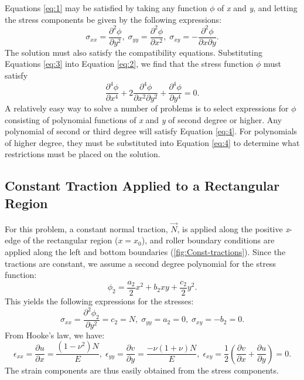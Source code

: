 Equations \ref{eq:1} may be satisfied by taking any function $\phi$
of \textit{x} and \textit{y}, and letting the stress components be
given by the following expressions:
\begin{equation}
\sigma_{xx}=\frac{\partial^{2}\phi}{\partial y^{2}},\;\sigma_{yy}=\frac{\partial^{2}\phi}{\partial x^{2}},\;\sigma_{xy}=-\frac{\partial^{2}\phi}{\partial x\partial y}.\label{eq:3}
\end{equation}
The solution must also satisfy the compatibility equations. Substituting
Equations \ref{eq:3} into Equation \ref{eq:2}, we find that the
stress function $\phi$ must satisfy
\begin{equation}
\frac{\partial^{4}\phi}{\partial x^{4}}+2\frac{\partial^{4}\phi}{\partial x^{2}\partial y^{2}}+\frac{\partial^{4}\phi}{\partial y^{4}}=0.\label{eq:4}
\end{equation}
A relatively easy way to solve a number of problems is to select expressions
for $\phi$ consisting of polynomial functions of \textit{x} and \textit{y}
of second degree or higher. Any polynomial of second or third degree
will satisfy Equation \ref{eq:4}. For polynomials of higher degree,
they must be substituted into Equation \ref{eq:4} to determine what
restrictions must be placed on the solution.


\subsection{\label{sub:Analytical-Constant-Traction}Constant Traction Applied
to a Rectangular Region}

For this problem, a constant normal traction, $\overrightarrow{N}$,
is applied along the positive \textit{x}-edge of the rectangular region
($x=x_{0}$), and roller boundary conditions are applied along the
left and bottom boundaries (\ref{fig:Const-tractions}). Since the
tractions are constant, we assume a second degree polynomial for the
stress function:
\begin{equation}
\phi_{2}=\frac{a_{2}}{2}x^{2}+b_{2}xy+\frac{c_{2}}{2}y^{2}.\label{eq:5}
\end{equation}
This yields the following expressions for the stresses:
\begin{equation}
\sigma_{xx}=\frac{\partial^{2}\phi_{2}}{\partial y^{2}}=c_{2}=N,\;\sigma_{yy}=a_{2}=0,\;\sigma_{xy}=-b_{2}=0.\label{eq:6}
\end{equation}
From Hooke's law, we have:
\begin{equation}
\epsilon_{xx}=\frac{\partial u}{\partial x}=\frac{\left(1-\nu^{2}\right)N}{E},\;\epsilon_{yy}=\frac{\partial v}{\partial y}=\frac{-\nu\left(1+\nu\right)N}{E},\;\epsilon_{xy}=\frac{1}{2}\left(\frac{\partial v}{\partial x}+\frac{\partial u}{\partial y}\right)=0.\label{eq:7}
\end{equation}
The strain components are thus easily obtained from the stress components.

